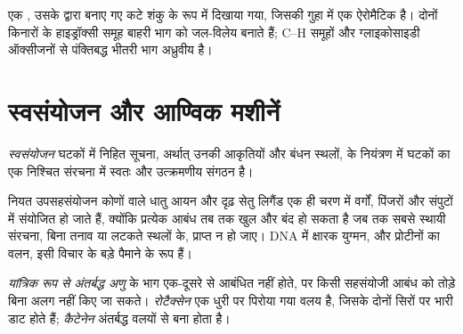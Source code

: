 \begin{omfigure}

{\small एक , उसके द्वारा बनाए गए कटे शंकु के रूप में दिखाया गया, जिसकी गुहा में
एक ऐरोमैटिक  है। दोनों किनारों के हाइड्रॉक्सी समूह बाहरी भाग को
जल-विलेय बनाते हैं; C--H समूहों और ग्लाइकोसाइडी ऑक्सीजनों से पंक्तिबद्ध भीतरी भाग
अध्रुवीय है।}
\end{omfigure}

\section{स्वसंयोजन और आण्विक मशीनें}

\begin{definition}[स्वसंयोजन]\label{def:b3:supramolecular:self-assembly}
\emph{स्वसंयोजन} घटकों में निहित सूचना, अर्थात् उनकी आकृतियों और बंधन
स्थलों, के नियंत्रण में घटकों का एक निश्चित संरचना में स्वतः और उत्क्रमणीय
संगठन है।
\end{definition}

नियत उपसहसंयोजन कोणों वाले धातु आयन और दृढ़ सेतु लिगैंड एक ही चरण में
वर्गों, पिंजरों और संपुटों में संयोजित हो जाते हैं, क्योंकि प्रत्येक आबंध तब तक खुल
और बंद हो सकता है जब तक सबसे स्थायी संरचना, बिना तनाव या लटकते स्थलों के,
प्राप्त न हो जाए। DNA में क्षारक युग्मन, और प्रोटीनों का वलन, इसी विचार के
बड़े पैमाने के रूप हैं।

\begin{definition}[यांत्रिक रूप से अंतर्बद्ध अणु]\label{def:b3:supramolecular:interlocked}
\emph{यांत्रिक रूप से अंतर्बद्ध अणु}
के भाग एक-दूसरे से आबंधित नहीं होते, पर किसी सहसंयोजी आबंध को तोड़े बिना
अलग नहीं किए जा सकते। \emph{रोटैक्सेन} एक धुरी पर पिरोया गया
वलय है, जिसके दोनों सिरों पर भारी डाट होते हैं;
\emph{कैटेनेन} अंतर्बद्ध वलयों से बना होता है।
\end{definition}

